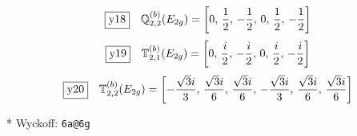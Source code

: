 \documentclass[fleqn,10pt,landscape]{jsarticle}
\begin{document}
\begin{dmath*}
\fbox{y18}\quad \mathbb{Q}_{2,2}^{(b)}(E_{2g})=\left[ 0,\, \frac{1}{2},\, - \frac{1}{2},\, 0,\, \frac{1}{2},\, - \frac{1}{2} \right]
\end{dmath*}
\begin{dmath*}
\fbox{y19}\quad \mathbb{T}_{2,1}^{(b)}(E_{2g})=\left[ 0,\, \frac{i}{2},\, - \frac{i}{2},\, 0,\, \frac{i}{2},\, - \frac{i}{2} \right]
\end{dmath*}
\begin{dmath*}
\fbox{y20}\quad \mathbb{T}_{2,2}^{(b)}(E_{2g})=\left[ - \frac{\sqrt{3} i}{3},\, \frac{\sqrt{3} i}{6},\, \frac{\sqrt{3} i}{6},\, - \frac{\sqrt{3} i}{3},\, \frac{\sqrt{3} i}{6},\, \frac{\sqrt{3} i}{6} \right]
\end{dmath*}
\vspace{5mm}

\noindent ** Wyckoff: \texttt{6a@6g}
\end{document}
